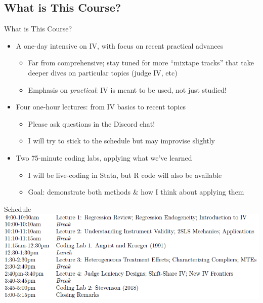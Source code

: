 \documentclass{beamer}
\begin{document}
\subsection{What is This Course?}
\begin{frame}{What is This Course?}
\begin{itemize}
\item A one-day intensive on IV, with focus on recent practical advances \pause{}\smallskip
\begin{itemize}
\item Far from comprehensive; stay tuned for more ``mixtape tracks'' that take deeper dives on particular topics (judge IV, etc)\smallskip
\item Emphasis on \emph{practical}: IV is meant to be used, not just studied!
\end{itemize}\pause{}\smallskip
\item Four one-hour lectures: from IV basics to recent topics\pause{}
\begin{itemize}
\item Please ask questions in the Discord chat!\smallskip
\item I will try to stick to the schedule but may improvise slightly
\end{itemize}\pause{}\smallskip
\item Two 75-minute coding labs, applying what we've learned\pause{}\smallskip
\begin{itemize}
\item I will be live-coding in Stata, but R code will also be available\smallskip
\item Goal: demonstrate both methods \& how I think about applying them
\end{itemize}
\end{itemize}
\end{frame}

\begin{frame}{Schedule}
\includegraphics[scale=0.55]{./lecture_includes/schedule.png}
\end{frame}
\end{document}
